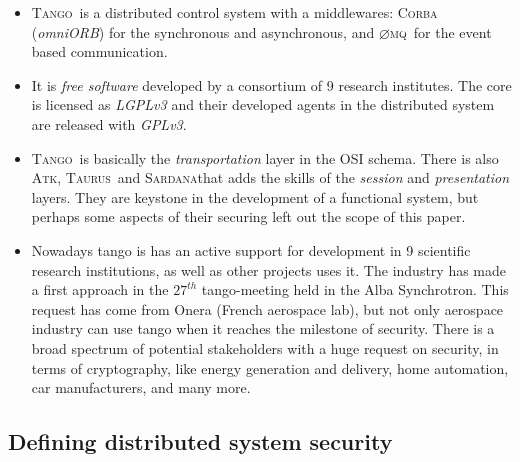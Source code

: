 \documentclass[10pt,a4paper,twoside]{llncs}
\newcommand{\tango}{\textsc{Tango}}
\newcommand{\sardana}{\textsc{Sardana}}
\newcommand{\taurus}{\textsc{Taurus}}
\newcommand{\atk}{\textsc{Atk}}
\newcommand{\zmq}{\textsc{$\varnothing$mq}}
\newcommand{\corba}{\textsc{Corba}}
\begin{document}
\begin{itemize}
    \item \tango\, is a distributed control system with a middlewares: \corba\, (\emph{omniORB}) for the synchronous and asynchronous, and \zmq\, for the event based communication.
    \item It is \emph{free software} developed by a consortium of 9 research institutes. The core is licensed as \emph{LGPLv3} and their developed agents in the distributed system are released with \emph{GPLv3}.
    \item \tango\, is basically the \emph{transportation} layer in the OSI schema. There is also \atk, \taurus\, and \sardana that adds the skills of the \emph{session} and \emph{presentation} layers. They are keystone in the development of a functional system, but perhaps some aspects of their securing left out the scope of this paper.
    \item Nowadays tango is has an active support for development in 9 scientific research institutions, as well as other projects uses it. The industry has made a first approach in the $27^{th}$ tango-meeting held in the Alba Synchrotron. This request has come from Onera (French aerospace lab), but not only aerospace industry can use tango when it reaches the milestone of security. There is a broad spectrum of potential stakeholders with a huge request on security, in terms of cryptography, like energy generation and delivery, home automation, car manufacturers, and many more.
\end{itemize}

%
\subsection{Defining distributed system security \label{sec:distributedSecuritySystems}}
\end{document}
